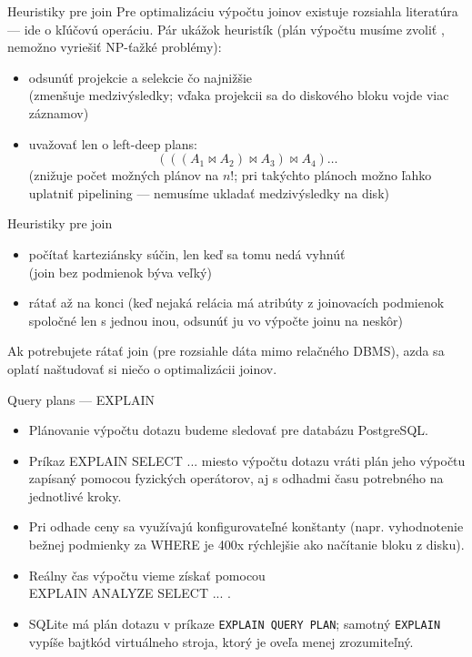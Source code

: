 \documentclass[12pt]{beamer}
\DeclareMathOperator{\join}{\bowtie}
\begin{document}
\begin{frame}[fragile]{Heuristiky pre join}
Pre optimalizáciu výpočtu joinov existuje rozsiahla literatúra --- ide o kľúčovú operáciu.
Pár ukážok heuristík (plán výpočtu musíme zvoliť , nemožno vyriešiť NP-ťažké problémy):
\begin{itemize}
  \item odsunúť projekcie a selekcie čo najnižšie\\(zmenšuje medzivýsledky; vďaka projekcii sa do diskového bloku vojde viac záznamov)
  \item uvažovať len o left-deep plans:
    $$(((A_1\join A_2)\join A_3)\join A_4)\dots$$
    (znižuje počet možných plánov na $n!$; pri takýchto plánoch možno ľahko uplatniť pipelining --- nemusíme ukladať medzivýsledky na disk)
\end{itemize}
\end{frame}

\begin{frame}[fragile]{Heuristiky pre join}
\begin{itemize}
  \item počítať karteziánsky súčin, len keď sa tomu nedá vyhnúť\\
    (join bez podmienok býva veľký)
  \item {} rátať až na konci (keď nejaká relácia má atribúty z joinovacích podmienok spoločné len s jednou inou, odsunúť ju vo výpočte joinu na neskôr)
\end{itemize}
Ak potrebujete rátať join  (pre rozsiahle dáta mimo relačného DBMS), azda sa oplatí naštudovať si niečo o optimalizácii joinov.
\end{frame}

\begin{frame}[fragile]{Query plans --- EXPLAIN}
\begin{itemize}
  \item Plánovanie výpočtu dotazu budeme sledovať pre databázu PostgreSQL.
  \item Príkaz EXPLAIN SELECT ... miesto výpočtu dotazu vráti
      plán jeho výpočtu zapísaný pomocou fyzických operátorov,
      aj s odhadmi času potrebného na jednotlivé kroky.
  \item Pri odhade ceny sa využívajú konfigurovateľné konštanty
  (napr. vyhodnotenie bežnej podmienky za WHERE je 400x rýchlejšie ako načítanie bloku z disku).
  \item Reálny čas výpočtu vieme získať pomocou\\ EXPLAIN ANALYZE SELECT ... .
  \item SQLite má plán dotazu v príkaze \texttt{EXPLAIN QUERY PLAN}; samotný \texttt{EXPLAIN} vypíše bajtkód virtuálneho stroja, ktorý je oveľa menej zrozumiteľný.
\end{itemize}
\end{frame}
\end{document}
